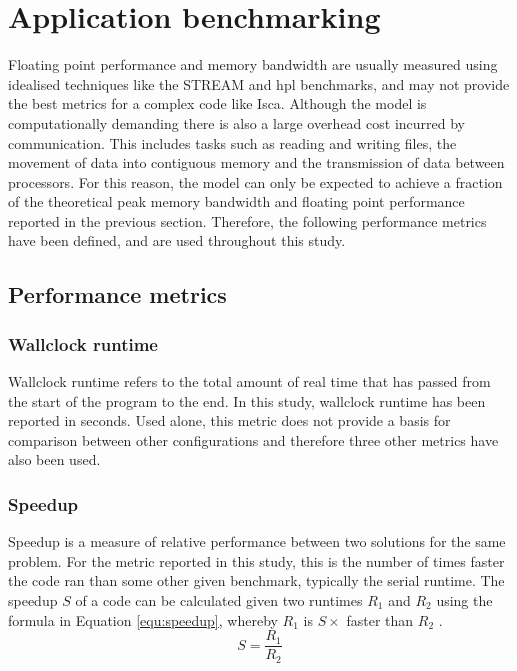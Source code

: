\documentclass[a4paper,11pt]{report}
\begin{document}
\section{Application benchmarking}
\label{sec:app-benchmarking}
Floating point performance and memory bandwidth are usually measured using idealised techniques like the STREAM and \gls{hpl} benchmarks, and may not provide the best metrics for a complex code like Isca. Although the model is computationally demanding there is also a large overhead cost incurred by communication. This includes tasks such as reading and writing files, the movement of data into contiguous memory and the transmission of data between processors. For this reason, the model can only be expected to achieve a fraction of the theoretical peak memory bandwidth and floating point performance reported in the previous section. Therefore, the following performance metrics have been defined, and are used throughout this study.
\subsection{Performance metrics}

\subsubsection{Wallclock runtime} 
Wallclock runtime refers to the total amount of real time that has passed from the start of the program to the end. In this study, wallclock runtime has been reported in seconds. Used alone, this metric does not provide a basis for comparison between other configurations and therefore three other metrics have also been used.
	
\subsubsection{Speedup} 
Speedup is a measure of relative performance between two solutions for the same problem. For the metric reported in this study, this is the number of times faster the code ran than some other given benchmark, typically the serial runtime. The speedup $S$ of a code can be calculated given two runtimes $R_1$ and $R_2$ using the formula in Equation \ref{equ:speedup}, whereby $R_1$ is $S\times$ faster than $R_2$ \cite{kumar1994analyzing}.
\begin{equation}
S = \frac{R_1}{R_2} 
\label{equ:speedup}
\end{equation}
	
\end{document}
